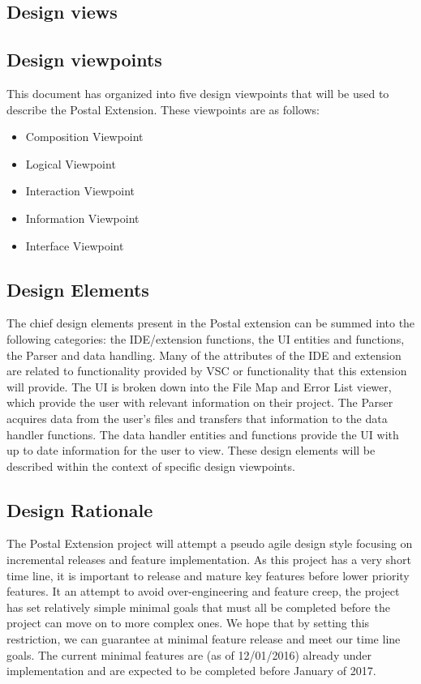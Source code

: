 \documentclass[letterpaper,10pt,titlepage,draftclsnofoot,onecolumn,onesided] {IEEEtran}
\begin{document}
\subsection{Design views}

\subsection{Design viewpoints}
This document has organized into five design viewpoints that will be used to describe the Postal Extension.
These viewpoints are as follows:
\begin {itemize}
\item Composition Viewpoint
\item Logical Viewpoint
\item Interaction Viewpoint
\item Information Viewpoint
\item Interface Viewpoint
\end {itemize}

\subsection{Design Elements}
The chief design elements present in the Postal extension can be summed into the following categories: the IDE/extension functions, the UI entities and functions, the Parser and data handling.
Many of the attributes of the IDE and extension are related to functionality provided by VSC or functionality that this extension will provide. 
The UI is broken down into the File Map and Error List viewer, which provide the user with relevant information on their project.
The Parser acquires data from the user's files and transfers that information to the data handler functions.
The data handler entities and functions provide the UI with up to date information for the user to view.
These design elements will be described within the context of specific design viewpoints.

\subsection{Design Rationale}
The Postal Extension project will attempt a pseudo agile design style focusing on incremental releases and feature implementation.
As this project has a very short time line, it is important to release and mature key features before lower priority features. 
It an attempt to avoid over-engineering and feature creep, the project has set relatively simple minimal goals that must all be completed before the project can move on to more complex ones.
We hope that by setting this restriction, we can guarantee at minimal feature release and meet our time line goals.
The current minimal features are (as of 12/01/2016) already under implementation and are expected to be completed before January of 2017.
\end{document}
